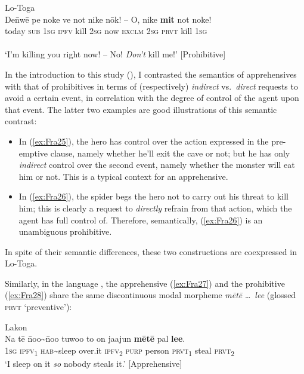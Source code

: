 \documentclass[output=paper,colorlinks,citecolor=brown]{langscibook}
\begin{document}
\ea \label{ex:Fra26} \textnormal{Lo-Toga}  \\
\gll De\={n}wē pe noke ve not nike nōk! -- O, nike \textbf{mit} not noke! \\
today \textsc{sub} \textsc{1sg} \textsc{ipfv} kill \textsc{2sg} now {} \textsc{exclm} \textsc{2sg} \textsc{prvt} kill \textsc{1sg} \\
 \\
`I'm killing you right now! -- No! \textit{Don't} kill me!' \hfill [Prohibitive] 
\z

In the introduction to this study (), I contrasted the semantics of apprehensives with that of prohibitives in terms of (respectively) \textit{indirect} vs.\ \textit{direct} requests to avoid a certain event, in correlation with the degree of control of the agent upon that event. The latter two examples are good illustrations of this semantic contrast:

\begin{itemize}
    \item In (\ref{ex:Fra25}), the hero has control over the action expressed in the pre-emptive clause, namely whether he'll exit the cave or not; but he has only \textit{indirect} control over the second event, namely whether the monster will eat him or not. This is a typical context for an apprehensive. 
    \item In (\ref{ex:Fra26}), the spider begs the hero not to carry out his threat to kill him; this is clearly a  request to \textit{directly} refrain from that action, which the agent has full control of. Therefore, semantically, (\ref{ex:Fra26}) is an unambiguous prohibitive.
\end{itemize}

\noindent In spite of their semantic differences, these two constructions are coexpressed in Lo\nobreakdash-Toga.

Similarly, in the language , the apprehensive (\ref{ex:Fra27}) and the prohibitive (\ref{ex:Fra28}) share the same discontinuous modal morpheme \textit{mētē} \ldots\ \textit{lee} (glossed \textsc{prvt} `preventive'):

\ea \label{ex:Fra27} \textnormal{Lakon}  \\
\gll Na tē \={n}oo\textasciitilde\={n}oo tuwoo to on jaajun \textbf{mētē} pal \textbf{lee}. \\
\textsc{1sg} \textsc{ipfv}\textsubscript{1} \textsc{hab}\textasciitilde sleep over.it \textsc{ipfv}\textsubscript{2} \textsc{purp} person \textsc{prvt}\textsubscript{1} steal \textsc{prvt}\textsubscript{2} \\
\glt `I sleep on it \textit{so} nobody steals it.' \hfill [Apprehensive]
\z
\end{document}
